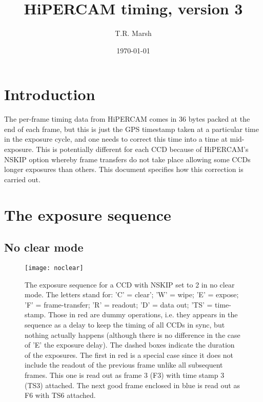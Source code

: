 \documentclass[12pt,a4paper]{article}
\title{HiPERCAM timing, version 3}
\author{T.R. Marsh}
\date{\today}
\begin{document}
\maketitle

\section{Introduction}

The per-frame timing data from HiPERCAM comes in 36 bytes packed at the end of
each frame, but this is just the GPS timestamp taken at a particular time in
the exposure cycle, and one needs to correct this time into a time at
mid-exposure. This is potentially different for each CCD because of HiPERCAM's
NSKIP option whereby frame transfers do not take place allowing some CCDs
longer exposures than others. This document specifies how this correction is
carried out.

\section{The exposure sequence}

\subsection{No clear mode}

\begin{figure}
\begin{center}
\texttt{[image: noclear]}
\end{center}
\caption{\label{noclear} The exposure sequence for a CCD with NSKIP set to 2 in
  no clear mode.  The letters stand for: 'C' = clear'; 'W' = wipe; 'E' =
  expose; 'F' = frame-transfer; 'R' = readout; 'D' = data out; 'TS' =
  time-stamp. Those in red are dummy operations, i.e. they appears in the
  sequence as a delay to keep the timing of all CCDs in sync, but nothing
  actually happens (although there is no difference in the case of 'E' the
  exposure delay). The dashed boxes indicate the duration of the
  exposures. The first in red is a special case since it does not include the
  readout of the previous frame unlike all subsequent frames. This one is read
  out as frame 3 (F3) with time stamp 3 (TS3) attached. The next good frame
  enclosed in blue is read out as F6 with TS6 attached.}
\end{figure}
\end{document}
